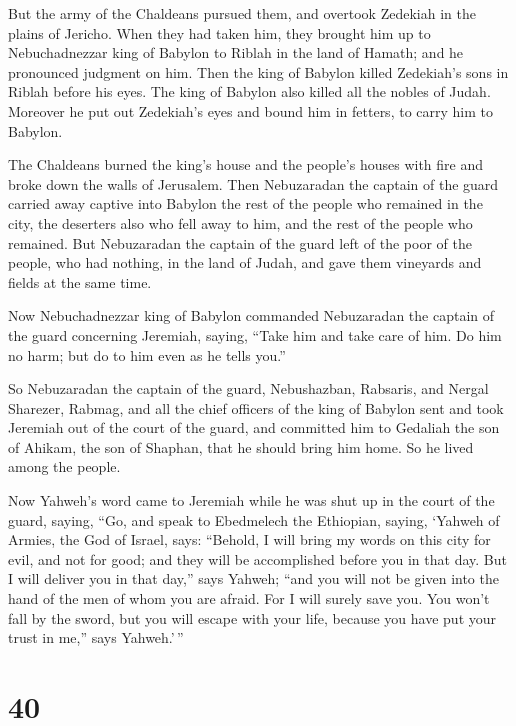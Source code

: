  But the army of the Chaldeans pursued them, and overtook
Zedekiah in the plains of Jericho. When they had taken him, they brought
him up to Nebuchadnezzar king of Babylon to Riblah in the land of
Hamath; and he pronounced judgment on him.  Then the king
of Babylon killed Zedekiah's sons in Riblah before his eyes. The king of
Babylon also killed all the nobles of Judah.  Moreover he
put out Zedekiah's eyes and bound him in fetters, to carry him to
Babylon.

 The Chaldeans burned the king's house and the people's
houses with fire and broke down the walls of Jerusalem. 
Then Nebuzaradan the captain of the guard carried away captive into
Babylon the rest of the people who remained in the city, the deserters
also who fell away to him, and the rest of the people who remained.
 But Nebuzaradan the captain of the guard left of the
poor of the people, who had nothing, in the land of Judah, and gave them
vineyards and fields at the same time.

 Now Nebuchadnezzar king of Babylon commanded Nebuzaradan
the captain of the guard concerning Jeremiah, saying, 
``Take him and take care of him. Do him no harm; but do to him even as
he tells you.''

 So Nebuzaradan the captain of the guard, Nebushazban,
Rabsaris, and Nergal Sharezer, Rabmag, and all the chief officers of the
king of Babylon  sent and took Jeremiah out of the court
of the guard, and committed him to Gedaliah the son of Ahikam, the son
of Shaphan, that he should bring him home. So he lived among the people.

 Now Yahweh's word came to Jeremiah while he was shut up
in the court of the guard, saying,  ``Go, and speak to
Ebedmelech the Ethiopian, saying, `Yahweh of Armies, the God of Israel,
says: ``Behold, I will bring my words on this city for evil, and not for
good; and they will be accomplished before you in that day.
 But I will deliver you in that day,'' says Yahweh; ``and
you will not be given into the hand of the men of whom you are afraid.
 For I will surely save you. You won't fall by the sword,
but you will escape with your life, because you have put your trust in
me,'' says Yahweh.'\,''

\hypertarget{section-39}{%
\section{40}\label{section-39}}

